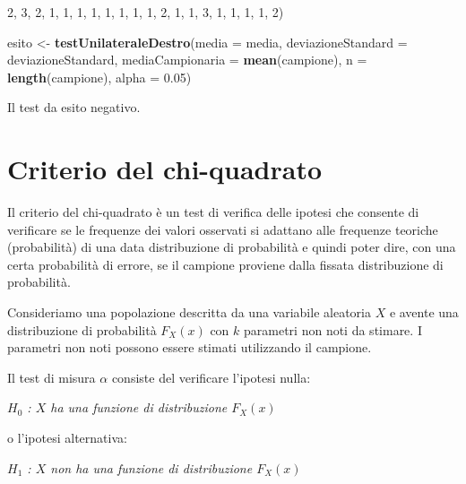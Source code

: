 \documentclass[]{book}
\newenvironment{Shaded}{\begin{snugshade}}{\end{snugshade}}
\newcommand{\KeywordTok}[1]{\textcolor[rgb]{0.13,0.29,0.53}{\textbf{#1}}}
\newcommand{\DataTypeTok}[1]{\textcolor[rgb]{0.13,0.29,0.53}{#1}}
\newcommand{\DecValTok}[1]{\textcolor[rgb]{0.00,0.00,0.81}{#1}}
\newcommand{\FloatTok}[1]{\textcolor[rgb]{0.00,0.00,0.81}{#1}}
\newcommand{\StringTok}[1]{\textcolor[rgb]{0.31,0.60,0.02}{#1}}
\newcommand{\NormalTok}[1]{#1}
\begin{document}
\begin{Shaded}
\begin{Highlighting}[]
              \DecValTok{2}\NormalTok{, }\DecValTok{3}\NormalTok{, }\DecValTok{2}\NormalTok{, }\DecValTok{1}\NormalTok{, }\DecValTok{1}\NormalTok{, }\DecValTok{1}\NormalTok{, }\DecValTok{1}\NormalTok{, }\DecValTok{1}\NormalTok{, }\DecValTok{1}\NormalTok{, }\DecValTok{1}\NormalTok{, }\DecValTok{1}\NormalTok{, }\DecValTok{2}\NormalTok{, }\DecValTok{1}\NormalTok{, }\DecValTok{1}\NormalTok{, }\DecValTok{3}\NormalTok{, }\DecValTok{1}\NormalTok{, }\DecValTok{1}\NormalTok{, }\DecValTok{1}\NormalTok{, }\DecValTok{1}\NormalTok{, }\DecValTok{2}\NormalTok{)}

\NormalTok{esito <-}\StringTok{ }\KeywordTok{testUnilateraleDestro}\NormalTok{(}\DataTypeTok{media =}\NormalTok{ media, }
                               \DataTypeTok{deviazioneStandard =}\NormalTok{ deviazioneStandard, }
                               \DataTypeTok{mediaCampionaria =} \KeywordTok{mean}\NormalTok{(campione), }
                               \DataTypeTok{n =} \KeywordTok{length}\NormalTok{(campione), }
                               \DataTypeTok{alpha =} \FloatTok{0.05}\NormalTok{)}
\end{Highlighting}
\end{Shaded}

Il test da esito negativo.

\chapter{Criterio del chi-quadrato}\label{criterio-del-chi-quadrato}

Il criterio del chi-quadrato è un test di verifica delle ipotesi che
consente di verificare se le frequenze dei valori osservati si adattano
alle frequenze teoriche (probabilità) di una data distribuzione di
probabilità e quindi poter dire, con una certa probabilità di errore, se
il campione proviene dalla fissata distribuzione di probabilità.

Consideriamo una popolazione descritta da una variabile aleatoria \(X\)
e avente una distribuzione di probabilità \(F_X(x)\) con \(k\) parametri
non noti da stimare. I parametri non noti possono essere stimati
utilizzando il campione.

Il test di misura \(\alpha\) consiste del verificare l'ipotesi nulla:

\emph{\(H_0\) : \(X\) ha una funzione di distribuzione \(F_X(x)\)}

o l'ipotesi alternativa:

\emph{\(H_1\) : \(X\) non ha una funzione di distribuzione \(F_X(x)\)}
\end{document}

